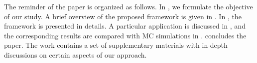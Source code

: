 The reminder of the paper is organized as follows. In , we formulate the objective of our study. A brief overview of the proposed framework is given in . In , the framework is presented in details. A particular application is discussed in , and the corresponding results are compared with MC simulations in .  concludes the paper. The work contains a set of supplementary materials with in-depth discussions on certain aspects of our approach.
